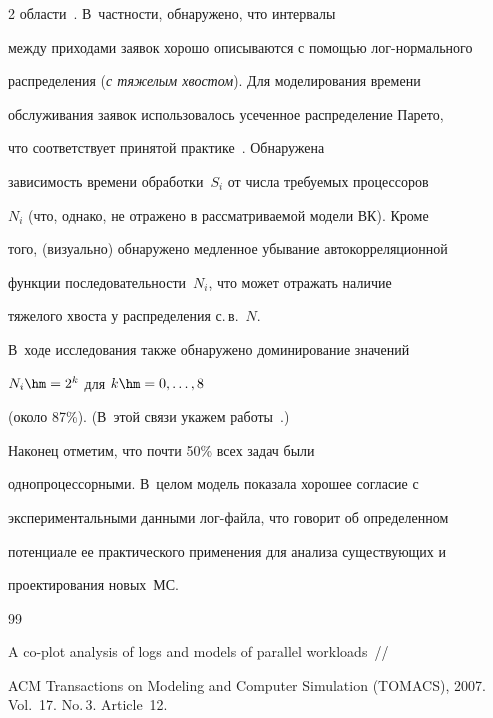 \begin{multicols}{2}
области~\cite{feit-coplot}. В~част\-ности, обнаружено, что интервалы

между приходами заявок хорошо описываются с помощью лог-нормального

распределения ({\it с тяжелым хвостом}). Для моделирования времени

обслуживания заявок использовалось усеченное распределение Парето,

что соответствует принятой практике~\cite{gupta10}.  Обнаружена

зависимость времени обработки~$S_i$  от числа требуемых процессоров

$N_{i}$ (что, однако, не отражено в рассматриваемой модели ВК). Кроме

того, (визуально) обнаружено медленное убывание автокорреляционной

функции последовательности~$N_{i}$, что  может отражать наличие

тяжелого хвоста у  распределения с.\,в.~$N$.

 В~ходе исследования также обнаружено  доминирование значений

$N_i\hm=2^k$ для   $k\hm=0,\ldots,8$

 (около 87\%). (В~этой связи   укажем  работы~\cite{krampe10, downey99}.)

Наконец отметим, что почти 50\% всех задач были

однопроцессорными. В~целом модель показала хорошее согласие с

экспериментальными данными лог-фай\-ла, что говорит об определенном

потенциале ее практического применения для анализа существующих и

проектирования новых~МС.



{\small\frenchspacing

{%


\begin{thebibliography}{99}





A co-plot analysis of logs and models of parallel workloads~// 

ACM Transactions on Modeling and Computer Simulation (TOMACS), 2007. Vol.~17. No.\,3. Article~12.




\end{thebibliography}}}
\end{multicols}

